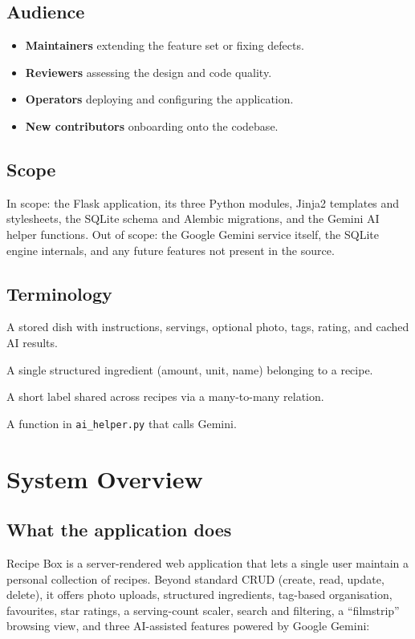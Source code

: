 \documentclass[11pt,a4paper]{article}
\newcommand{\code}[1]{\texttt{#1}}
\begin{document}
\subsection{Audience}
\begin{itemize}[nosep]
  \item \textbf{Maintainers} extending the feature set or fixing defects.
  \item \textbf{Reviewers} assessing the design and code quality.
  \item \textbf{Operators} deploying and configuring the application.
  \item \textbf{New contributors} onboarding onto the codebase.
\end{itemize}

\subsection{Scope}
In scope: the Flask application, its three Python modules, Jinja2 templates and
stylesheets, the SQLite schema and Alembic migrations, and the Gemini AI helper
functions. Out of scope: the Google Gemini service itself, the SQLite engine
internals, and any future features not present in the source.

\subsection{Terminology}
\begin{description}[nosep,leftmargin=3.2cm]
  \item[Recipe] A stored dish with instructions, servings, optional photo,
        tags, rating, and cached AI results.
  \item[Ingredient line] A single structured ingredient (amount, unit, name)
        belonging to a recipe.
  \item[Tag] A short label shared across recipes via a many-to-many relation.
  \item[AI helper] A function in \code{ai\_helper.py} that calls Gemini.
\end{description}

\section{System Overview}

\subsection{What the application does}
Recipe Box is a server-rendered web application that lets a single user maintain
a personal collection of recipes. Beyond standard CRUD (create, read, update,
delete), it offers photo uploads, structured ingredients, tag-based organisation,
favourites, star ratings, a serving-count scaler, search and filtering, a
``filmstrip'' browsing view, and three AI-assisted features powered by Google
Gemini:
\end{document}
